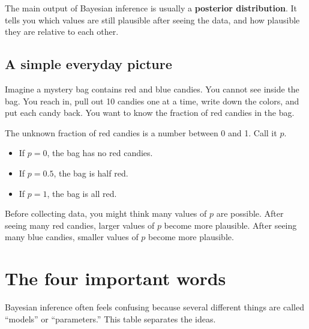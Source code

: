 \documentclass[11pt]{article}
\begin{document}
\begin{bigidea}
The main output of Bayesian inference is usually a \textbf{posterior distribution}. It tells you which values are still plausible after seeing the data, and how plausible they are relative to each other.
\end{bigidea}

\subsection*{A simple everyday picture}

Imagine a mystery bag contains red and blue candies. You cannot see inside the bag. You reach in, pull out 10 candies one at a time, write down the colors, and put each candy back. You want to know the fraction of red candies in the bag.

The unknown fraction of red candies is a number between 0 and 1. Call it $p$.

\begin{itemize}[leftmargin=1.5em]
  \item If $p=0$, the bag has no red candies.
  \item If $p=0.5$, the bag is half red.
  \item If $p=1$, the bag is all red.
\end{itemize}

Before collecting data, you might think many values of $p$ are possible. After seeing many red candies, larger values of $p$ become more plausible. After seeing many blue candies, smaller values of $p$ become more plausible.

\section{The four important words}

Bayesian inference often feels confusing because several different things are called ``models'' or ``parameters.'' This table separates the ideas.
\end{document}
